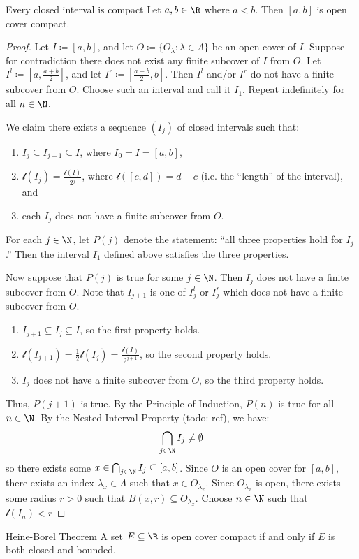 \begin{thmbox}{Every closed interval is compact}{}
    Let $a,b \in \R$ where $a < b$. Then $[a,b]$ is open cover compact.
    \tcblower
    \begin{proof}
        Let $I \coloneq [a,b]$, and let $O \coloneq \{O_\lambda : \lambda \in \Lambda\}$ be an open cover of $I$. Suppose for contradiction there does not exist any finite subcover of $I$ from $O$. Let $I^l \coloneq \left[ a, \frac{a+b}{2} \right]$, and let $I^r \coloneq \left[ \frac{a+b}{2}, b \right]$. Then $I^l$ and/or $I^r$ do not have a finite subcover from $O$. Choose such an interval and call it $I_1$. Repeat indefinitely for all $n \in \N$.
        \begin{notebox}
            We claim there exists a sequence $(I_j)$ of closed intervals such that:
            \begin{enumerate}
                \item $I_j \subseteq I_{j-1} \subseteq I$, where $I_0 = I = [a,b]$,
                \item $\mathscr{l}(I_j) = \frac{\mathscr{l}(I)}{2^j}$, where $\mathscr{l}([c,d]) = d - c$ (i.e. the ``length'' of the interval), and
                \item each $I_j$ does not have a finite subcover from $O$.
            \end{enumerate}
        \end{notebox}
        For each $j \in \N$, let $P(j)$ denote the statement: ``all three properties hold for $I_j$.'' Then the interval $I_1$ defined above satisfies the three properties. 

        Now suppose that $P(j)$ is true for some $j \in \N$. Then $I_j$ does not have a finite subcover from $O$.
        Note that $I_{j+1}$ is one of $I_j^l$ or $I_j^r$ which does not have a finite subcover from $O$.
        \begin{enumerate}
            \item $I_{j+1} \subseteq I_j \subseteq I$, so the first property holds.
            \item $\mathscr{l}(I_{j+1}) = \frac{1}{2} \mathscr{l}(I_j) = \frac{\mathscr{l}(I)}{2^{j+1}}$, so the second property holds.
            \item $I_j$ does not have a finite subcover from $O$, so the third property holds.
        \end{enumerate}
        Thus, $P(j+1)$ is true. By the Principle of Induction, $P(n)$ is true for all $n \in \N$. By the Nested Interval Property (todo: ref), we have:
        \[ \bigcap_{j \in \N} I_j \neq \emptyset \]
        so there exists some $x \in \bigcap_{j \in \N} I_j \subseteq [a,b]$. Since $O$ is an open cover for $[a,b]$, there exists an index $\lambda_x \in \Lambda$ such that $x \in O_{\lambda_x}$. Since $O_{\lambda_x}$ is open, there exists some radius $r > 0$ such that $B(x,r) \subseteq O_{\lambda_x}$. Choose $n \in \N$ such that $\mathscr{l}(I_n) < r $
    \end{proof}
\end{thmbox}

\begin{thmbox}{Heine-Borel Theorem}{}
    A set $E \subseteq \R$ is open cover compact if and only if $E$ is both closed and bounded.
\end{thmbox}
